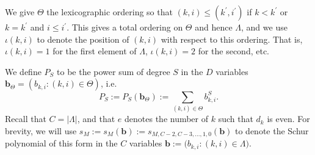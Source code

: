 \documentclass{amsart}
\theoremstyle{definition}
\theoremstyle{remark}
\newcommand{\bs}{\boldsymbol}
\begin{document}
We give $\Theta$ the lexicographic ordering so that
$(k,i)\leq(k^\prime,i^\prime)$ if $k < k^\prime$ or $k = k^\prime$ and $i \leq i^\prime$. This gives a total
ordering on $\Theta$ and hence $\Lambda$, and we use $\iota(k,i)$ to denote the position of $(k,i)$
with respect to this ordering. That is, $\iota(k,i) = 1$ for the first element of $\Lambda$,
$\iota(k,i) = 2$ for the second, etc.

We define $P_S$ to be the power sum of degree $S$ in the $D$ variables $\bs{b}_\Theta = ( b_{k,i} : (k,i)\in\Theta)$,
i.e.
\[
    P_S :=  P_S(\bs{b}_\Theta) := \sum\limits_{(k,i)\in\Theta} b_{k,i}^S.
\]
Recall that $C=|\Lambda|$, and that $e$ denotes the number of $k$ such that $d_k$ is even.
For brevity, we will use $s_M := s_M(\bs{b}) :=  s_{M,C-2,C-3, \ldots, 1, 0}(\bs{b})$ to denote the Schur polynomial of this form
in the $C$ variables $\bs{b} := \big(b_{k,i} : (k,i)\in\Lambda\big)$.
\end{document}
